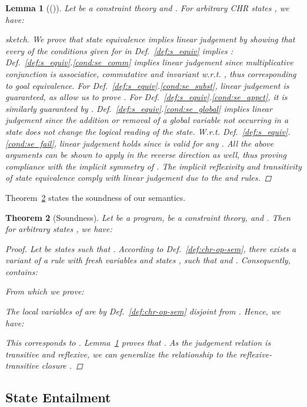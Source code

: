 \documentclass[acmtocl]{acmtrans2m}
\newtheorem{theorem}{Theorem}[section]
\newtheorem{lemma}[theorem]{Lemma}
\begin{document}
\begin{lemma}[()]
  \label{lemma:sq-ll}
  Let  be a constraint theory and . For arbitrary CHR
  states , we have: 
\begin{proof}[sketch] We prove that state equivalence 
implies linear judgement  by showing that every of the conditions
given for  in Def.~\ref{def:s_equiv}
implies : Def.~\ref{def:s_equiv}.\ref{cond:se_comm}
implies linear judgement since multiplicative conjunction is associatice, commutative and invariant w.r.t.
  , thus corresponding to goal equivalence. For
  Def.~\ref{def:s_equiv}.\ref{cond:se_subst}, linear judgement is guaranteed, as
   allow us to prove . For
  Def.~\ref{def:s_equiv}.\ref{cond:se_appct}, it is similarly guaranteed by .
  Def.~\ref{def:s_equiv}.\ref{cond:se_global} implies linear judgement since
  the addition or removal of a global variable not occurring
   in a state does not change the logical reading of the state.
  W.r.t. Def.~\ref{def:s_equiv}.\ref{cond:se_fail}, linear judgement holds since
   is valid for any .
All the above arguments can be shown to apply in the reverse direction as well,
thus proving compliance with the implicit symmetry of . The
implicit reflexivity and transitivity of state equivalence comply with linear
judgement due to the  and  rules.
\end{proof}
\end{lemma}

Theorem~\ref{thm:soundness} states the soundness of our semantics.

\begin{theorem}[Soundness]
  \label{thm:soundness}
  Let  be a program,  be a constraint theory, and
  . Then for arbitrary states , we have:
  
\begin{proof}
Let  be states such that . According to
Def.~\ref{def:chr-op-sem}, there exists a variant of a rule with fresh variables
 and states
,   such that  and .
Consequently,  contains:

From which we prove:

The local variables  of  are by Def.~\ref{def:chr-op-sem} disjoint
from . Hence, we have:

This corresponds to . Lemma~\ref{lemma:sq-ll} proves that
. As the judgement relation  is transitive and reflexive, we can generalize the relationship
to the reflexive-transitive closure .
\end{proof}
\end{theorem}

\subsection{State Entailment}
	\label{sec:entailment}
\end{document}
